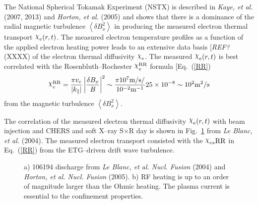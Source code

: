 \documentclass[a4paper,openany,12pt]{book}
\def\chix{\raise.5ex\hbox{$\chi$}}
\begin{document}
The National Spherical Tokamak Experiment (NSTX) is described in \emph{Kaye, et al.} (2007, 2013) and \emph{Horton, et al.} (2005) and shows that there is a dominance of the radial magnetic turbulence $\left<\delta B^2_x\right>$ in producing the measured electron thermal transport $\chix_e(r,t)$. The measured electron temperature profiles as a function of the applied electron heating power leads to an extensive data basis [\emph{REF?} (XXXX) of the electron thermal diffusivity $\chix_e$. The measured $\chix_e(r,t)$ is best correlated with the Rosenbluth--Rochester $\chix_e^{\rm RR}$ formula [Eq.~(\ref{RR})
\begin{equation}
\chix_e^{\rm RR}=\frac{\pi v_e}{|k_\||}\left|\frac{\delta B_x}{B}\right|^2\sim\frac{\pi 10^7\mathrm{m/s}/}{10^{-2}\rm m^{-1}}25\times 10^{-8}\sim 10^2\mathrm{m}^2/\mathrm{s}
\label{RR}
\end{equation}
from the magnetic turbulence $\left<\delta B^2_x\right>$.

The correlation of the measured electron thermal diffusivity $\chix_e(r,t)$ with beam injection and CHERS and soft X--ray S$\times$R day is shown in Fig.~\ref{F9.32} from \emph{Le Blanc, et al.} (2004). The measured electron transport consisted with the $\chix_{es}{\rm RR}$ in Eq.~(\ref{RR}) from the ETG--driven drift wave turbulence. 
%
\begin{figure}[H]
\centerline{}\vspace{-20pt}
\centerline{}
\caption{a) 106194 discharge from \emph{Le Blanc, et al.} \emph{Nucl. Fusion} (2004) and \emph{Horton, et al.} \emph{Nucl. Fusion} (2005). b) RF heating is up to an order of magnitude larger than the Ohmic heating. The plasma current is essential to the confinement properties.}
\label{F9.32}
\end{figure}
%
\end{document}
